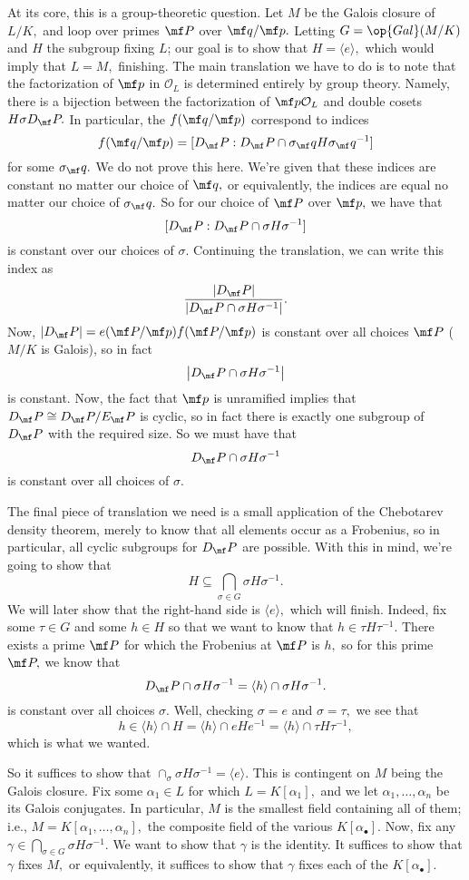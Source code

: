 At its core, this is a group-theoretic question. Let $M$ be the Galois closure of $L/K,$ and loop over primes $\mf P$ over $\mf q/\mf p.$ Letting $G=\op{Gal}(M/K)$ and $H$ the subgroup fixing $L$; our goal is to show that $H=\langle e\rangle,$ which would imply that $L=M,$ finishing. The main translation we have to do is to note that the factorization of $\mf p$ in $\mathcal O_L$ is determined entirely by group theory. Namely, there is a bijection between the factorization of $\mf p\mathcal O_L$ and double cosets $H\sigma D_\mf P.$ In particular, the $f(\mf q/\mf p)$ correspond to indices
\[f(\mf q/\mf p)=[D_\mf P:D_\mf P\cap\sigma_\mf qH\sigma_\mf q^{-1}]\]
for some $\sigma_\mf q.$ We do not prove this here. We're given that these indices are constant no matter our choice of $\mf q,$ or equivalently, the indices are equal no matter our choice of $\sigma_\mf q.$ So for our choice of $\mf P$ over $\mf p,$ we have that
\[[D_\mf P:D_\mf P\cap\sigma H\sigma^{-1}]\]
is constant over our choices of $\sigma.$ Continuing the translation, we can write this index as
\[\frac{|D_\mf P|}{\left|D_\mf P\cap\sigma H\sigma^{-1}\right|}.\]
Now, $|D_\mf P|=e(\mf P/\mf p)f(\mf P/\mf p)$ is constant over all choices $\mf P$ ($M/K$ is Galois), so in fact
\[\left|D_\mf P\cap\sigma H\sigma^{-1}\right|\]
is constant. Now, the fact that $\mf p$ is unramified implies that $D_\mf P\cong D_\mf P/E_\mf P$ is cyclic, so in fact there is exactly one subgroup of $D_\mf P$ with the required size. So we must have that
\[D_\mf P\cap\sigma H\sigma^{-1}\]
is constant over all choices of $\sigma.$

The final piece of translation we need is a small application of the Chebotarev density theorem, merely to know that all elements occur as a Frobenius, so in particular, all cyclic subgroups for $D_\mf P$ are possible. With this in mind, we're going to show that
\[H\subseteq\bigcap_{\sigma\in G}\sigma H\sigma^{-1}.\]
We will later show that the right-hand side is $\langle e\rangle,$ which will finish. Indeed, fix some $\tau\in G$ and some $h\in H$ so that we want to know that $h\in\tau H\tau^{-1}.$ There exists a prime $\mf P$ for which the Frobenius at $\mf P$ is $h,$ so for this prime $\mf P,$ we know that
\[D_\mf P\cap\sigma H\sigma^{-1}=\langle h\rangle\cap\sigma H\sigma^{-1}.\]
is constant over all choices $\sigma.$ Well, checking $\sigma=e$ and $\sigma=\tau,$ we see that
\[h\in\langle h\rangle\cap H=\langle h\rangle\cap eHe^{-1}=\langle h\rangle\cap\tau H\tau^{-1},\]
which is what we wanted.

So it suffices to show that $\cap_\sigma\sigma H\sigma^{-1}=\langle e\rangle.$ This is contingent on $M$ being the Galois closure. Fix some $\alpha_1\in L$ for which $L=K[\alpha_1],$ and we let $\alpha_1,\ldots,\alpha_n$ be its Galois conjugates. In particular, $M$ is the smallest field containing all of them; i.e., $M=K[\alpha_1,\ldots,\alpha_n],$ the composite field of the various $K[\alpha_\bullet].$ Now, fix any $\gamma\in\bigcap_{\sigma\in G}\sigma H\sigma^{-1}.$ We want to show that $\gamma$ is the identity. It suffices to show that $\gamma$ fixes $M,$ or equivalently, it suffices to show that $\gamma$ fixes each of the $K[\alpha_\bullet].$

